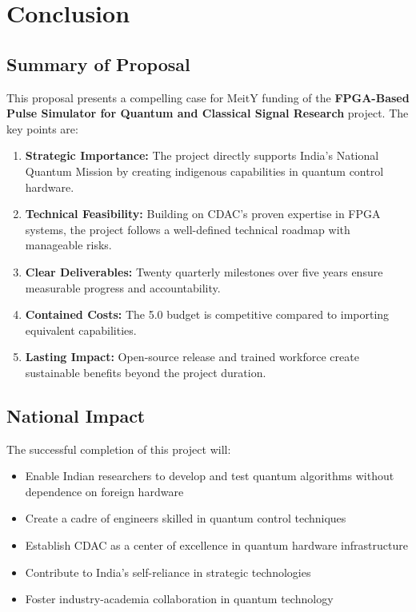 \documentclass[12pt,a4paper]{article}
\newcommand{\rupees}[1]{\text{₹}#1}
\newcommand{\crore}[1]{\rupees{#1}\text{ crores}}
\theoremstyle{definition}
\begin{document}
\section{Conclusion}
\label{sec:conclusion}

\subsection{Summary of Proposal}

This proposal presents a compelling case for MeitY funding of the \textbf{FPGA-Based Pulse Simulator for Quantum and Classical Signal Research} project. The key points are:

\begin{enumerate}
    \item \textbf{Strategic Importance:} The project directly supports India's National Quantum Mission by creating indigenous capabilities in quantum control hardware.
    
    \item \textbf{Technical Feasibility:} Building on CDAC's proven expertise in FPGA systems, the project follows a well-defined technical roadmap with manageable risks.
    
    \item \textbf{Clear Deliverables:} Twenty quarterly milestones over five years ensure measurable progress and accountability.
    
    \item \textbf{Contained Costs:} The \crore{5.0} budget is competitive compared to importing equivalent capabilities.
    
    \item \textbf{Lasting Impact:} Open-source release and trained workforce create sustainable benefits beyond the project duration.
\end{enumerate}

\subsection{National Impact}

The successful completion of this project will:

\begin{itemize}
    \item Enable Indian researchers to develop and test quantum algorithms without dependence on foreign hardware
    \item Create a cadre of engineers skilled in quantum control techniques
    \item Establish CDAC as a center of excellence in quantum hardware infrastructure
    \item Contribute to India's self-reliance in strategic technologies
    \item Foster industry-academia collaboration in quantum technology
\end{itemize}
\end{document}
